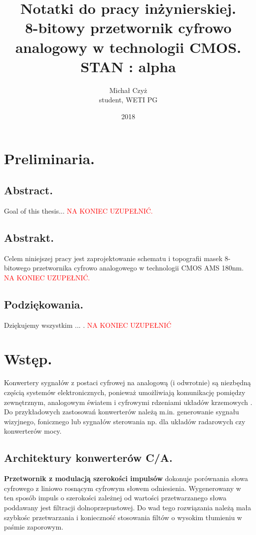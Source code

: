 \documentclass[10pt,a4paper]{report}
\title{Notatki do pracy inżynierskiej. \\ 8-bitowy przetwornik cyfrowo analogowy w technologii CMOS. \\ STAN : alpha}
\date{2018}
\author{Michał Czyż \\ student, WETI PG}
\begin{document}
	\maketitle
	
	\tableofcontents
	\newpage
	\chapter{Preliminaria.}
	\section{Abstract.}
	{	Goal of this thesis... \textcolor{red}{NA KONIEC UZUPEŁNIĆ.} }

	\section{Abstrakt.}
	{	Celem niniejszej pracy jest zaprojektowanie schematu i topografii masek 8-bitowego przetwornika cyfrowo analogowego w technologii CMOS AMS 180nm. \textcolor{red}{NA KONIEC UZUPEŁNIĆ.} }
	
	\section{Podziękowania.}
	{	Dziękujemy wszystkim ... . \textcolor{red}{NA KONIEC UZUPEŁNIĆ} }
	
	\chapter{Wstęp.}
	{	Konwertery sygnałów z postaci cyfrowej na analogową (i odwrotnie) są niezbędną częścią systemów elektronicznych, ponieważ umożliwiają komunikację pomiędzy zewnętrznym, analogowym światem i cyfrowymi rdzeniami układów krzemowych \cite{integconv}. Do przykładowych zastosowań konwerterów należą m.in. generowanie sygnału wizyjnego, fonicznego lub sygnałów sterowania np. dla układów radarowych czy konwerterów mocy. }
	
	\section{Architektury konwerterów C/A. \cite{plassche}}
	{	\textbf{Przetwornik z modulacją szerokości impulsów} dokonuje porównania słowa cyfrowego z liniowo rosnącym cyfrowym słowem odniesienia. Wygenerowany w ten sposób impuls o szerokości zależnej od wartości przetwarzanego słowa poddawany jest filtracji dolnoprzepustowej. Do wad tego rozwiązania należą mała szybkośc przetwarzania i konieczność stosowania filtów o wysokim tłumieniu w paśmie zaporowym. }
	
\end{document}
